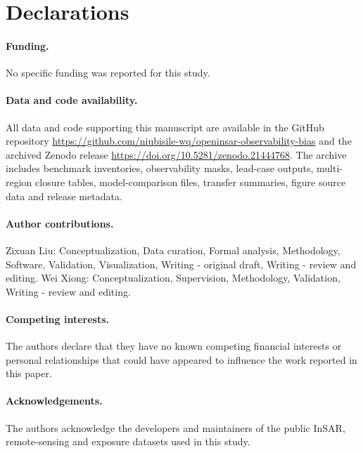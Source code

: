 \documentclass[pdflatex,sn-mathphys-ay]{sn-jnl}
\begin{document}
\backmatter
\section*{Declarations}

\paragraph{Funding.} No specific funding was reported for this study.

\paragraph{Data and code availability.} All data and code supporting this manuscript are available in the GitHub repository \url{https://github.com/niubisile-wq/openinsar-observability-bias} and the archived Zenodo release \url{https://doi.org/10.5281/zenodo.21444768}. The archive includes benchmark inventories, observability masks, lead-case outputs, multi-region closure tables, model-comparison files, transfer summaries, figure source data and release metadata.

\paragraph{Author contributions.} Zixuan Liu: Conceptualization, Data curation, Formal analysis, Methodology, Software, Validation, Visualization, Writing - original draft, Writing - review and editing. Wei Xiong: Conceptualization, Supervision, Methodology, Validation, Writing - review and editing.

\paragraph{Competing interests.} The authors declare that they have no known competing financial interests or personal relationships that could have appeared to influence the work reported in this paper.

\paragraph{Acknowledgements.} The authors acknowledge the developers and maintainers of the public InSAR, remote-sensing and exposure datasets used in this study.


\end{document}
